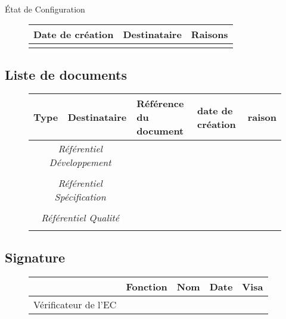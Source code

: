 
\label{modèle EC}

\begin{center}
\huge
\nomEquipe{}\\
État de Configuration\\
\end{center}
\vspace{0.5cm}


\begin{figure}[H]
		\centering
		\begin{tabularx}{17cm}{|p{4cm}|X|X|}
		\hline
		\rowcolor[gray]{0.85}Date de création & Destinataire & Raisons \\
		\hline
		 &  &  \\
		\hline
		\end{tabularx}
\end{figure}

\subsection*{Liste de documents}

\begin{figure}[H]
		\centering
		\begin{tabularx}{17cm}{|X|X|p{5cm}|p{2cm}|X|}
		\hline
		\rowcolor[gray]{0.85}Type & Destinataire & Référence du document & date de création & raison\\
		\hline
		\multicolumn{2}{|c|}{\textit{Référentiel Développement}}\\
		\hline 
		 &  &  &  &  \\
		\hline 
		\multicolumn{2}{|c|}{\textit{Référentiel Spécification}}\\
		\hline
		 &  &  &  &  \\
		\hline 
		\multicolumn{2}{|c|}{\textit{Référentiel Qualité}}\\
		\hline
		 &  &  &  &  \\
		\hline 
		\end{tabularx}
\end{figure}

\subsection*{Signature}

\begin{figure}[H]
		\centering
		\begin{tabularx}{17cm}{|p{4cm}|X|X|X|X|}
		\hline
		\rowcolor[gray]{0.85}& Fonction & Nom & Date & Visa \\
		\hline
		 Vérificateur de l'EC&  &  &  &  \\
		\hline
		\end{tabularx}
\end{figure}
